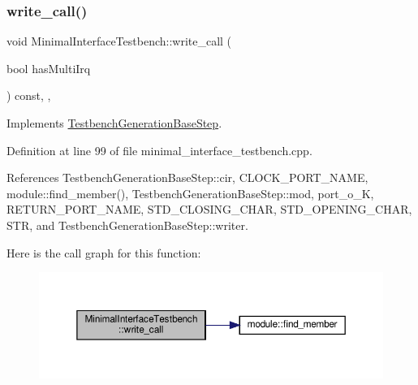 \subsubsection{\texorpdfstring{write\+\_\+call()}{write\_call()}}
{\footnotesize\ttfamily void Minimal\+Interface\+Testbench\+::write\+\_\+call (\begin{DoxyParamCaption}\item[{bool}]{has\+Multi\+Irq }\end{DoxyParamCaption}) const\hspace{0.3cm}{\ttfamily [override]}, {\ttfamily [protected]}, {\ttfamily [virtual]}}



Implements \hyperlink{classTestbenchGenerationBaseStep_a07a88446a9b569d6776e8d20ea323809}{Testbench\+Generation\+Base\+Step}.



Definition at line 99 of file minimal\+\_\+interface\+\_\+testbench.\+cpp.



References Testbench\+Generation\+Base\+Step\+::cir, C\+L\+O\+C\+K\+\_\+\+P\+O\+R\+T\+\_\+\+N\+A\+ME, module\+::find\+\_\+member(), Testbench\+Generation\+Base\+Step\+::mod, port\+\_\+o\+\_\+K, R\+E\+T\+U\+R\+N\+\_\+\+P\+O\+R\+T\+\_\+\+N\+A\+ME, S\+T\+D\+\_\+\+C\+L\+O\+S\+I\+N\+G\+\_\+\+C\+H\+AR, S\+T\+D\+\_\+\+O\+P\+E\+N\+I\+N\+G\+\_\+\+C\+H\+AR, S\+TR, and Testbench\+Generation\+Base\+Step\+::writer.

Here is the call graph for this function\+:
\nopagebreak
\begin{figure}[H]
\begin{center}
\leavevmode
\includegraphics[width=350pt]{d0/dba/classMinimalInterfaceTestbench_a646e461dfe469649ac2f67a7dac554b9_cgraph}
\end{center}
\end{figure}
\mbox{\label{classMinimalInterfaceTestbench_a017c01898d65736dccd9531a81151283}} 
